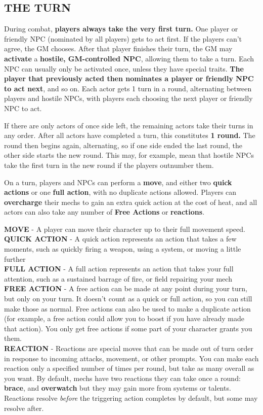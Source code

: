 \subsection{THE TURN}
During combat, \textbf{players always take the very first turn.} One player or friendly NPC (nominated by all players) gets to act first. If the players can’t agree, the GM chooses. After that player finishes their turn, the GM may \textbf{activate} a \textbf{hostile, GM-controlled NPC}, allowing them to take a turn. Each NPC can usually only be activated once, unless they have special traits. \textbf{The player that previously acted then nominates a player or friendly NPC to act next}, and so on. Each actor gets 1 turn in a round, alternating between players and hostile NPCs, with players each choosing the next player or friendly NPC to act.

If there are only actors of once side left, the remaining actors take their turns in any order. After all actors have completed a turn, this constitutes \textbf{1 round.} The round then begins again, alternating, so if one side ended the last round, the other side starts the new round. This may, for example, mean that hostile NPCs take the first turn in the new round if the players outnumber them.

On a turn, players and NPCs can perform a \textbf{move}, and either two \textbf{quick actions} or one \textbf{full action}, with no duplicate actions allowed. Players can \textbf{overcharge} their mechs to gain an extra quick action at the cost of heat, and all actors can also take any number of \textbf{Free Actions} or \textbf{reactions}.

\textbf{MOVE} - A player can move their character up to their full movement speed.\\
\textbf{QUICK ACTION} - A quick action represents an action that takes a few moments, such as quickly firing a weapon, using a system, or moving a little further\\
\textbf{FULL ACTION} - A full action represents an action that takes your full attention, such as a sustained barrage of fire, or field repairing your mech\\
\textbf{FREE ACTION} - A free action can be made at any point during your turn, but only on your turn. It doesn’t count as a quick or full action, so you can still make those as normal. Free actions can also be used to make a duplicate action (for example, a free action could allow you to boost if you have already made that action). You only get free actions if some part of your character grants you them.\\
\textbf{REACTION} - Reactions are special moves that can be made out of turn order in response to incoming attacks, movement, or other prompts. You can make each reaction only a specified number of times per round, but take as many overall as you want. By default, mechs have two reactions they can take once a round: \textbf{brace}, and \textbf{overwatch} but they may gain more from systems or talents. Reactions resolve \textit{before} the triggering action completes by default, but some may resolve after.

